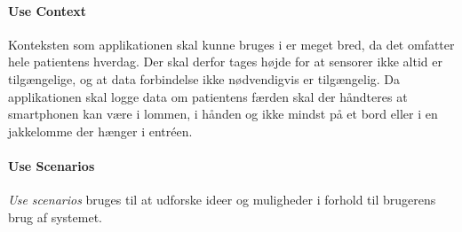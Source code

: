 \paragraph{Use Context}
Konteksten som applikationen skal kunne bruges i er meget bred, da det omfatter hele patientens hverdag.
Der skal derfor tages højde for at sensorer ikke altid er tilgængelige, og at data forbindelse ikke nødvendigvis er tilgængelig.
Da applikationen skal logge data om patientens færden skal der håndteres at smartphonen kan være i lommen, i hånden og ikke mindst på et bord eller i en jakkelomme der hænger i entréen.

\paragraph{Use Scenarios}
\textit{Use scenarios} bruges til at udforske ideer og muligheder i forhold til brugerens brug af systemet.

